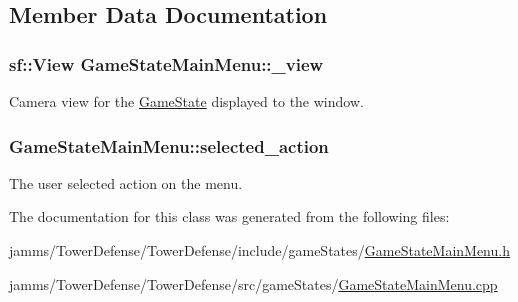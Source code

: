 \subsection{Member Data Documentation}
\hypertarget{class_game_state_main_menu_a0c21a143cf8c10490b03da6657a81232}{
\subsubsection[{\+\_\+view}]{\setlength{\rightskip}{0pt plus 5cm}sf\+::\+View Game\+State\+Main\+Menu\+::\+\_\+view\hspace{0.3cm}{\ttfamily [private]}}}\label{class_game_state_main_menu_a0c21a143cf8c10490b03da6657a81232}


Camera view for the \hyperlink{class_game_state}{Game\+State} displayed to the window. 

\hypertarget{class_game_state_main_menu_ae63addaca64e4099cd1afff642e0307d}{
\subsubsection[{selected\+\_\+action}]{ Game\+State\+Main\+Menu\+::selected\+\_\+action\hspace{0.3cm}{\ttfamily [private]}}}\label{class_game_state_main_menu_ae63addaca64e4099cd1afff642e0307d}


The user selected action on the menu. 



The documentation for this class was generated from the following files\+:\begin{DoxyCompactItemize}
\item 
jamms/\+Tower\+Defense/\+Tower\+Defense/include/game\+States/\hyperlink{_game_state_main_menu_8h}{Game\+State\+Main\+Menu.\+h}\item 
jamms/\+Tower\+Defense/\+Tower\+Defense/src/game\+States/\hyperlink{_game_state_main_menu_8cpp}{Game\+State\+Main\+Menu.\+cpp}\end{DoxyCompactItemize}
